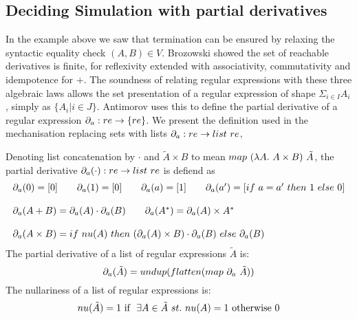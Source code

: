 \documentclass[a4paper,UKenglish,cleveref, autoref, thm-restate]{lipics-v2021}
\begin{document}
\subsection{Deciding Simulation with partial derivatives}
In the example above we saw that termination can be ensured by relaxing the syntactic equality check $(A,B) \in V$. Brozowski showed the set of reachable derivatives is finite, for reflexivity extended with associativity, commutativity and idempotence for $+$. The soundness of relating regular expressions with these three algebraic laws allows the set presentation of a regular expression of shape $\Sigma_{i \in I} A_i$, simply as $\{A_i | i \in J\}$. Antimorov uses this to define the partial derivative of a regular expression $\partial_a : re \rightarrow \{re\} $. We present the definition used in the mechanisation replacing sets with lists $\partial_a : \re \rightarrow \mathsf{list}~\re$, 
\begin{definition}
Denoting list concatenation by $\cdot$ and $\tilde{A} \times B$ to mean $\mymap{\lambda A.~A \times B}{\tilde{A}}$,
the partial derivative $\partial_a(\cdot) : \re \rightarrow \mathsf{list}~\re$ is defiend as
  \begin{displaymath}
    \begin{array}{lll}
\pd{a}{0} = [0] \qquad \pd{a}{1} = [0] \qquad \pd{a}{a} = [1] \qquad \pd{a}{a'} = [\mathsf{if}~a=a'~\mathsf{then}~1~\mathsf{else}~0]\\\\
\pd{a}{A + B} = \cat{\pd{a}{A}}{\pd{a}{B}} \qquad
\pd{a}{A^*} = \pd{a}{A} \times  A^*
\\\\
\pd{a}{A \times B} = \mathsf{if}~\mynu{A}~\mathsf{then}~ (\pd{a}{A} \times B) \cdot \pd{a}{B}~\mathsf{else}~\pd{a}{B}
    \end{array}
  \end{displaymath}
The partial derivative of a list of regular expressions $\tilde{A}$ is:
\[\pd{a}{\tilde{A}} = \mathsf{undup}(\mathsf{flatten}(\mymapn{\partial_a}{\tilde{A}}))\]
The nullariness of a list of regular expressions is:
\[\mynu{\tilde{A}} = 1 ~\text{if }~\exists A \in \tilde{A}~st. ~ \mynu{A}=1 \text{ otherwise } 0\]
\end{definition}
\end{document}
